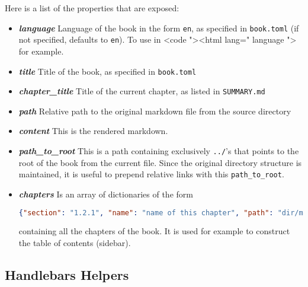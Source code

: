 \documentclass{article}
\begin{document}
Here is a list of the properties that are exposed:\\
\begin{itemize}
\item 
\emph{\textbf{language}} Language of the book in the form \lstinline|en|, as specified in \lstinline|book.toml| (if not specified, defaults to \lstinline|en|). To use in <code
 "><html lang="{{ language }}"> for example.\\

\item 
\emph{\textbf{title}} Title of the book, as specified in \lstinline|book.toml|\\

\item 
\emph{\textbf{chapter\_title}} Title of the current chapter, as listed in \lstinline|SUMMARY.md|\\

\item 
\emph{\textbf{path}} Relative path to the original markdown file from the source
directory\\

\item 
\emph{\textbf{content}} This is the rendered markdown.\\

\item 
\emph{\textbf{path\_to\_root}} This is a path containing exclusively \lstinline|../|'s that points
to the root of the book from the current file. Since the original directory
structure is maintained, it is useful to prepend relative links with this
\lstinline|path_to_root|.\\

\item 
\emph{\textbf{chapters}} Is an array of dictionaries of the form\\
\begin{lstlisting}[language=json]
{"section": "1.2.1", "name": "name of this chapter", "path": "dir/markdown.md"}

\end{lstlisting}

containing all the chapters of the book. It is used for example to construct
the table of contents (sidebar).\\

\end{itemize}

\subsection{Handlebars Helpers}
\label{Handlebars Helpers}
\label{handlebars-helpers}
\end{document}
